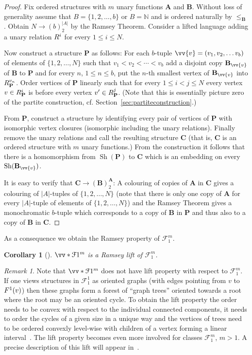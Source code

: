 \documentclass{elsarticle}
\def\sh{\mathop{\mathrm{Sh}}\nolimits}
\def\ordclasssup#1#2{\vv*{#1}{#2}}
\def\str#1{\mathbf {#1}}
\def\nbrel#1#2{R\ifstrempty{#1}{}{_{#1}}\ifstrempty{#2}{}{^{#2}}}
\def\rel#1#2{\nbrel{\ifstrempty{#1}{}{\str{#1}}}{#2}}
\def\func#1#2{\nbfunc{\ifstrempty{#1}{}{\str{#1}}}{#2}}
\def\nbfunc#1#2{F\ifstrempty{#1}{}{_{#1}}\ifstrempty{#2}{}{^{#2}}}
\theoremstyle{plain}
\newtheorem{corollary}[theorem]{Corollary}
\theoremstyle{definition}
\theoremstyle{remark}
\newtheorem*{remark}{Remark}
\begin{document}
\begin{proof}
Fix ordered structures with $m$ unary functions $\str{A}$ and $\str{B}$.
Without loss of generality assume that $B=\{1,2,\ldots, b\}$ or $B=\mathbb N$ and is ordered naturally by $\leq_\str{B}$.
 Obtain $N\longrightarrow (b)^{\vert A\vert }_2$ by the Ramsey Theorem.
Consider a lifted language adding a unary relation $\rel{}{i}$ for every $1\leq i\leq N$.

Now construct a structure $\str{P}$ as follows: For each $b$-tuple $\vv{v}=(v_1,v_2,\ldots v_b)$ of elements of $\{1,2,\ldots,N\}$ such that $v_1< v_2<\cdots< v_b$ add a disjoint copy $\str{B}_{\vv{v}}$ of $\str{B}$ to $\str{P}$ and for every $n$, $1\leq n\leq b$, put the $n$-th smallest vertex of $\str B_{\vv{v}}$ into $\rel{P}{v_n}$. Order vertices of $\str{P}$ linearly such that for every $1\leq i< j\leq N$ every vertex $v\in \rel{P}{i}$ is before every vertex $v'\in \rel{P}{j}$. (Note that this is essentially picture zero of the partite construction, cf. Section~\ref{sec:partiteconstruction}.)

From $\str P$, construct a structure by identifying every pair of vertices of $\str{P}$ with isomorphic vertex closures (isomorphic including the unary relations). Finally remove the unary relations and call the resulting structure $\str{C}$ (that is, $\str{C}$
is an ordered structure with $m$ unary functions.)  From the construction it follows that there is a homomorphism from $\sh(\str{P})$ to $\str{C}$ which is an embedding on every $\sh(\str{B}_{\vv{v}})$.

It is easy to verify that $\str{C}\to (\str{B})^\str{A}_2$: A colouring of copies of $\str{A}$ in $\str{C}$ gives a colouring of $\vert A\vert $-tuples of $\{1,2,\ldots, N\}$ (note that there is only one copy of $\str{A}$ for every $\vert A\vert $-tuple of elements of $\{1,2,\ldots,N\}$) and the Ramsey Theorem gives a monochromatic $b$-tuple which corresponds to a copy of $\str{B}$ in $\str{P}$ and thus also to a copy of $\str{B}$ in $\str{C}$.
\end{proof}
As a consequence we obtain the Ramsey property of $\mathcal F^m_1$.
\begin{corollary}[\cite{Sokic2016}]
$\ordclasssup{\mathcal F}{1}^m$ is a Ramsey lift of $\mathcal F^m_1$.
\end{corollary}
\begin{remark}
Note that $\ordclasssup{\mathcal F}{1}^m$ does not have lift property with respect to $\mathcal F^m_1$.
If one views structures in $\mathcal F^1_1$ as oriented graphs (with edges
 pointing from $v$ to $\func{}{1}(v)$) then these graphs form a forest of ``graph trees''
oriented towards a root where the root may be an oriented cycle. To obtain the
lift property the order needs to be convex with respect to the individual
connected components, it needs to order the cycles of a given size in a unique
way and the vertices of trees need to be ordered convexly level-wise with
children of a vertex forming a linear interval~\cite{Sokic2016}.
  The lift property becomes even more involved for classes $\mathcal F^m_1$, $m>1$.
 A precise description of this lift will appear in~\cite{Evans2}. 
\end{remark}
\end{document}
